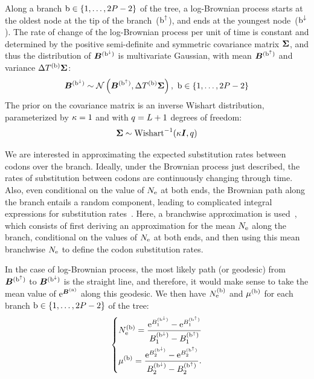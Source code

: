 \documentclass{MBE}
\begin{document}
	Along a branch $\text{b} \in \{1, \hdots, 2 P - 2\}$ of the tree, a log-Brownian process starts at the oldest node at the tip of the branch~($\text{b}^{\uparrow}$), and ends at the youngest node~($\text{b}^{\downarrow}$).
	The rate of change of the log-Brownian process per unit of time is constant and determined by the positive semi-definite and symmetric covariance matrix $\bm{\Sigma}$, and thus the distribution of $\bm{B}^{(\text{b}^{\downarrow})}$ is multivariate Gaussian, with mean $\bm{B}^{(\text{b}^{\uparrow})}$ and variance $\Delta T^{(\text{b})} \bm{\Sigma}$:
	\begin{equation}
		\label{eq:DistribBrownian}
		\Brownian^{(\nodeDown)} \sim \mathcal{N}\left(\Brownian^{(\nodeUp)}, \branchtime\branchexp \CovarianceMatrix \right),\ \Setbranch
	\end{equation}
	The {prior} on the covariance matrix is an inverse Wishart distribution, parameterized by $\kappa=1$ and with $q=L + 1$ degrees of freedom:
	\begin{equation}
		\label{eq:Distribcovariance}
		\CovarianceMatrix \sim \text{Wishart}^{-1} (\covariancekappa \Identitymatrix, \covariancedf)
	\end{equation}

	We are interested in approximating the expected substitution rates between codons over the branch.
	Ideally, under the Brownian process just described, the rates of substitution between codons are continuously changing through time.
	Also, even conditional on the value of $N_{\text{e}}$ at both ends, the Brownian path along the branch entails a random component, leading to complicated integral expressions for substitution rates~\citep{Horvilleur2014}.
	Here, a branchwise approximation is used~\citep{Lartillot2011}, which consists of first deriving an approximation for the mean $N_{\text{e}}$ along the branch, conditional on the values of $N_{\text{e}}$ at both ends, and then using this mean branchwise $N_{\text{e}}$ to define the codon substitution rates.

	In the case of log-Brownian process, the most likely path (or geodesic) from $\bm{B}^{(\text{b}^{\uparrow})}$ to $\bm{B}^{(\text{b}^{\downarrow})}$ is the straight line, and therefore, it would make sense to take the mean value of $\text{e}^{\bm{B}^{(\text{n})}}$ along this geodesic.
	We then have $N_{\text{e}}^{(\text{b})}$ and $\mu^{(\text{b})}$ for each branch $\text{b} \in \{1, \hdots, 2 P - 2\}$ of the tree:
	\begin{equation}
		\label{eq:branchNemu}
		\begin{dcases}
			\Ne\branchexp = \dfrac{\e^{\brownian_{1}^{(\nodeDown)}} - \e^{\brownian_{1}^{(\nodeUp)}}}{\brownian_{1}^{(\nodeDown)} - \brownian_{1}^{(\nodeUp)}} \\
			\mu\branchexp = \dfrac{\e^{\brownian_{2}^{(\nodeDown)}} - \e^{\brownian_{2}^{(\nodeUp)}}}{\brownian_{2}^{(\nodeDown)} - \brownian_{2}^{(\nodeUp)}}.
		\end{dcases}
	\end{equation}
	
\end{document}
